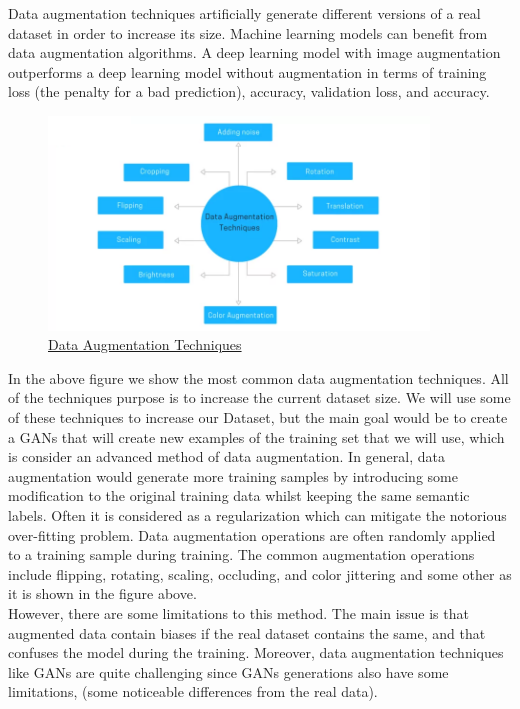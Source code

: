 Data augmentation techniques artificially generate different versions of a real dataset in order to increase its size. Machine learning models can benefit from data augmentation algorithms. A deep learning model with image augmentation outperforms a deep learning model without augmentation in terms of training loss (the penalty for a bad prediction), accuracy, validation loss, and accuracy.

 \begin{figure}[h]
	\centering
	\includegraphics[width=0.9\textwidth]{figures/background/DataAugmentation.png}
	\captionsetup{labelformat=empty}
	\caption{\href{https://research.aimultiple.com/wp-content/webp-express/webp-images/uploads/2021/04/data-augmentation-techniques-800x450.png.webp}
	{Data Augmentation Techniques}}
\end{figure}

In the above figure we show the most common data augmentation techniques. All of the techniques purpose is to increase the current dataset size. We will use some of these techniques to increase our Dataset, but the main goal would be to create a GANs that will create new examples of the training set that we will use, which is consider an advanced method of data augmentation. In general, data augmentation would generate more training samples by introducing some modification to the original training data whilst keeping the
same semantic labels. Often it is considered as a regularization which can mitigate the notorious over-fitting problem. Data augmentation operations are often randomly applied to a training sample during training. The common augmentation operations include flipping, rotating, scaling, occluding, and color jittering and some other as it is shown in the figure above. \\

However, there are some limitations to this method. The main issue is that augmented data contain biases if the real dataset contains the same, and that confuses the model during the training. Moreover, data augmentation techniques like GANs are quite challenging since GANs generations also have some limitations, (some noticeable differences from the real data).